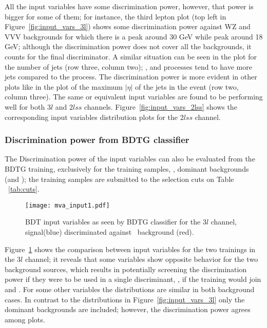 All the input variables have some discrimination power, however, that power is bigger for some of them; for instance, the third lepton \pt plot (top left in Figure~\ref{fig:input_vars_3l}) shows some discrimination power against WZ and VVV backgrounds for which there is a peak around 30 GeV while \tHq peak around 18 GeV; although the discrimination power does not cover all the backgrounds, it counts for the final discriminator. A similar situation can be seen in the plot for the number of jets (row three, column two); \ttW, \ttZ and \ttH processes tend to have more jets compared to the \tHq process. The discrimination power is more evident in other plots like in the plot of the maximum $|\eta|$ of the jets in the event (row two, column three). The same or equivalent input variables are found to be performing well for both $3l$ and $2lss$ channels. Figure~\ref{fig:input_vars_2lss} shows the corresponding input variables distribution plots for the $2lss$ channel.

\subsubsection*{Discrimination power from BDTG classifier}


The Discrimination power of the input variables can also be evaluated from the BDTG training, exclusively for the training samples, \ie, dominant backgrounds (\ttbar and \ttV); the training samples are submitted to the selection cuts on Table ~\ref{tab:cuts}.

\begin{figure} [!ht]
  \centering
  \texttt{[image: mva\_input1.pdf]}
  \caption[BDT input variables. Discrimination against \ttbar and \ttV\ in $3l$ channel.]{BDT input variables as seen by BDTG classifier for the $3l$ channel, \tHq signal(blue) discriminated against \ttV\ background (red).}
\label{fig:mva_input_comp}
\end{figure}

Figure~\ref{fig:mva_input_comp} shows the comparison between input variables for the two trainings in the $3l$ channel; it reveals that some variables show opposite behavior for the two background sources, which results in potentially screening the discrimination power if they were to be used in a single discriminant, \ie, if the training would join \ttbar and \ttV. For some other variables the distributions are similar in both background cases. In contrast to the distributions in Figure~\ref{fig:input_vars_3l} only the dominant backgrounds are included; however, the discrimination power agrees among plots.

